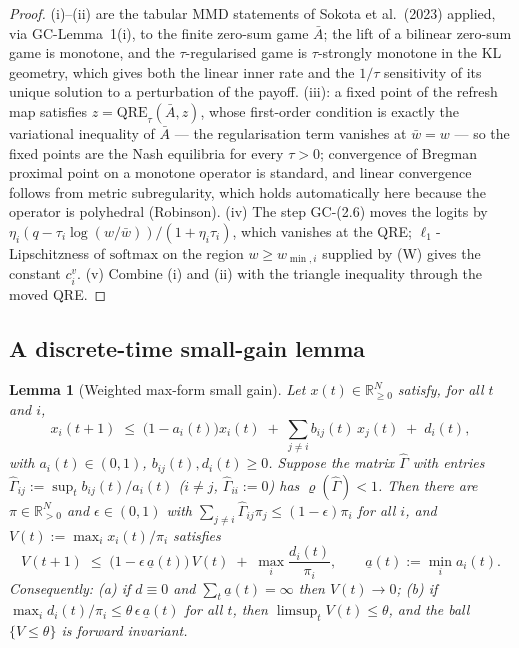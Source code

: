 \documentclass[11pt]{article}
\newtheorem{lemma}{Lemma}
\theoremstyle{definition}
\newcommand{\R}{\mathbb{R}}
\newcommand{\GC}[1]{\textsf{GC-#1}}
\begin{document}
\begin{proof}
(i)--(ii) are the tabular MMD statements of Sokota et al.\ (2023) applied, via
\GC{Lemma~1}(i), to the finite zero-sum game $\bar A$; the lift of a bilinear
zero-sum game is monotone, and the $\tau$-regularised game is $\tau$-strongly
monotone in the KL geometry, which gives both the linear inner rate and the
$1/\tau$ sensitivity of its unique solution to a perturbation of the payoff.
(iii): a fixed point of the refresh map satisfies $z = \mathrm{QRE}_\tau(\bar
A, z)$, whose first-order condition is exactly the variational inequality of
$\bar A$ --- the regularisation term vanishes at $\bar w = w$ --- so the fixed
points are the Nash equilibria for every $\tau > 0$; convergence of Bregman
proximal point on a monotone operator is standard, and linear convergence follows
from metric subregularity, which holds automatically here because the operator
is polyhedral (Robinson). (iv) The step \GC{(2.6)} moves the logits by
$\eta_i(q - \tau_i\log(w/\bar w))/(1 + \eta_i\tau_i)$, which vanishes at the QRE;
$\ell_1$-Lipschitzness of $\mathrm{softmax}$ on the region $w \ge w_{\min,i}$
supplied by (W) gives the constant $c^v_i$. (v) Combine (i) and (ii) with the
triangle inequality through the moved QRE.
\end{proof}

\subsection{A discrete-time small-gain lemma}

\begin{lemma}[Weighted max-form small gain]\label{lem:sg}
Let $x(t) \in \R^N_{\ge 0}$ satisfy, for all $t$ and $i$,
\[
  x_i(t+1) \;\le\; \big(1 - a_i(t)\big)x_i(t)
  \;+\; \sum_{j \ne i} b_{ij}(t)\, x_j(t) \;+\; d_i(t),
\]
with $a_i(t) \in (0,1)$, $b_{ij}(t), d_i(t) \ge 0$. Suppose the matrix
$\hat\Gamma$ with entries $\hat\Gamma_{ij} := \sup_t b_{ij}(t)/a_i(t)$
($i \ne j$, $\hat\Gamma_{ii} := 0$) has $\varrho(\hat\Gamma) < 1$. Then there are
$\pi \in \R^N_{>0}$ and $\epsilon \in (0,1)$ with $\sum_{j\ne i}
\hat\Gamma_{ij}\pi_j \le (1-\epsilon)\pi_i$ for all $i$, and
$V(t) := \max_i x_i(t)/\pi_i$ satisfies
\[
  V(t+1) \;\le\; \big(1 - \epsilon\, \underline a(t)\big)\,V(t)
  \;+\; \max_i \frac{d_i(t)}{\pi_i},
  \qquad \underline a(t) := \min_i a_i(t) .
\]
Consequently: (a) if $d \equiv 0$ and $\sum_t \underline a(t) = \infty$ then
$V(t) \to 0$; (b) if $\max_i d_i(t)/\pi_i \le \theta\,\epsilon\,\underline a(t)$
for all $t$, then $\limsup_t V(t) \le \theta$, and the ball $\{V \le \theta\}$ is
forward invariant.
\end{lemma}
\end{document}
